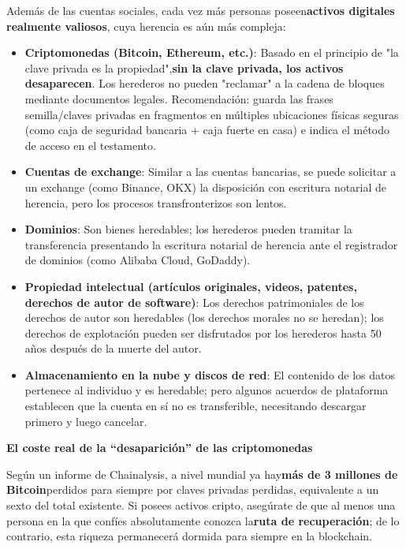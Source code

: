 
Además de las cuentas sociales, cada vez más personas poseen\textbf{activos digitales realmente valiosos}, cuya herencia es aún más compleja:

\begin{itemize}
  \item \textbf{Criptomonedas (Bitcoin, Ethereum, etc.)}: Basado en el principio de "la clave privada es la propiedad",\textbf{sin la clave privada, los activos desaparecen}. Los herederos no pueden "reclamar" a la cadena de bloques mediante documentos legales. Recomendación: guarda las frases semilla/claves privadas en fragmentos en múltiples ubicaciones físicas seguras (como caja de seguridad bancaria + caja fuerte en casa) e indica el método de acceso en el testamento.
  \item \textbf{Cuentas de exchange}: Similar a las cuentas bancarias, se puede solicitar a un exchange (como Binance, OKX) la disposición con escritura notarial de herencia, pero los procesos transfronterizos son lentos.
  \item \textbf{Dominios}: Son bienes heredables; los herederos pueden tramitar la transferencia presentando la escritura notarial de herencia ante el registrador de dominios (como Alibaba Cloud, GoDaddy).
  \item \textbf{Propiedad intelectual (artículos originales, videos, patentes, derechos de autor de software)}: Los derechos patrimoniales de los derechos de autor son heredables (los derechos morales no se heredan); los derechos de explotación pueden ser disfrutados por los herederos hasta 50 años después de la muerte del autor.
  \item \textbf{Almacenamiento en la nube y discos de red}: El contenido de los datos pertenece al individuo y es heredable; pero algunos acuerdos de plataforma establecen que la cuenta en sí no es transferible, necesitando descargar primero y luego cancelar.
\end{itemize}

\textbf{El coste real de la “desaparición” de las criptomonedas}\par

Según un informe de Chainalysis, a nivel mundial ya hay\textbf{más de 3 millones de Bitcoin}perdidos para siempre por claves privadas perdidas, equivalente a un sexto del total existente. Si posees activos cripto, asegúrate de que al menos una persona en la que confíes absolutamente conozca la\textbf{ruta de recuperación}; de lo contrario, esta riqueza permanecerá dormida para siempre en la blockchain.

